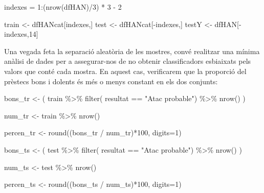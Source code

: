 \documentclass[
]{article}
\newenvironment{Shaded}{\begin{snugshade}}{\end{snugshade}}
\newcommand{\AttributeTok}[1]{\textcolor[rgb]{0.80,0.80,0.80}{#1}}
\newcommand{\DecValTok}[1]{\textcolor[rgb]{0.86,0.86,0.80}{#1}}
\newcommand{\FunctionTok}[1]{\textcolor[rgb]{0.94,0.94,0.56}{#1}}
\newcommand{\NormalTok}[1]{\textcolor[rgb]{0.80,0.80,0.80}{#1}}
\newcommand{\OtherTok}[1]{\textcolor[rgb]{0.94,0.94,0.56}{#1}}
\newcommand{\SpecialCharTok}[1]{\textcolor[rgb]{0.86,0.64,0.64}{#1}}
\newcommand{\StringTok}[1]{\textcolor[rgb]{0.80,0.58,0.58}{#1}}
\begin{document}
\begin{Shaded}
\begin{Highlighting}[]
\NormalTok{indexes }\OtherTok{=} \DecValTok{1}\SpecialCharTok{:}\NormalTok{(}\FunctionTok{nrow}\NormalTok{(dfHAN)}\SpecialCharTok{/}\DecValTok{3}\NormalTok{) }\SpecialCharTok{*} \DecValTok{3} \SpecialCharTok{{-}} \DecValTok{2}

\NormalTok{train }\OtherTok{\textless{}{-}}\NormalTok{ dfHANcat[indexes,]}
\NormalTok{test }\OtherTok{\textless{}{-}}\NormalTok{ dfHANcat[}\SpecialCharTok{{-}}\NormalTok{indexes,]}
\NormalTok{testY }\OtherTok{\textless{}{-}}\NormalTok{ dfHAN[}\SpecialCharTok{{-}}\NormalTok{indexes,}\DecValTok{14}\NormalTok{]}
\end{Highlighting}
\end{Shaded}

Una vegada feta la separació aleatòria de les mostres, convé realitzar
una mínima anàlisi de dades per a assegurar-nos de no obtenir
classificadors esbiaixats pels valors que conté cada mostra. En aquest
cas, verificarem que la proporció del prèstecs bons i dolents és més o
menys constant en els dos conjunts:

\begin{Shaded}
\begin{Highlighting}[]
\NormalTok{bons\_tr }\OtherTok{\textless{}{-}}\NormalTok{ ( train }\SpecialCharTok{\%\textgreater{}\%}
             \FunctionTok{filter}\NormalTok{( resultat }\SpecialCharTok{==} \StringTok{"Atac probable"}\NormalTok{) }\SpecialCharTok{\%\textgreater{}\%}
             \FunctionTok{nrow}\NormalTok{() )}
      

\NormalTok{num\_tr }\OtherTok{\textless{}{-}}\NormalTok{ train }\SpecialCharTok{\%\textgreater{}\%} \FunctionTok{nrow}\NormalTok{()}

\NormalTok{percen\_tr }\OtherTok{\textless{}{-}} \FunctionTok{round}\NormalTok{((bons\_tr }\SpecialCharTok{/}\NormalTok{ num\_tr)}\SpecialCharTok{*}\DecValTok{100}\NormalTok{, }\AttributeTok{digits=}\DecValTok{1}\NormalTok{)}

\NormalTok{bons\_ts }\OtherTok{\textless{}{-}}\NormalTok{ ( test }\SpecialCharTok{\%\textgreater{}\%}
             \FunctionTok{filter}\NormalTok{( resultat }\SpecialCharTok{==} \StringTok{"Atac probable"}\NormalTok{) }\SpecialCharTok{\%\textgreater{}\%}
             \FunctionTok{nrow}\NormalTok{() )}

\NormalTok{num\_ts }\OtherTok{\textless{}{-}}\NormalTok{ test }\SpecialCharTok{\%\textgreater{}\%} \FunctionTok{nrow}\NormalTok{()}

\NormalTok{percen\_ts }\OtherTok{\textless{}{-}} \FunctionTok{round}\NormalTok{((bons\_ts }\SpecialCharTok{/}\NormalTok{ num\_ts)}\SpecialCharTok{*}\DecValTok{100}\NormalTok{, }\AttributeTok{digits=}\DecValTok{1}\NormalTok{)}
\end{Highlighting}
\end{Shaded}
\end{document}
